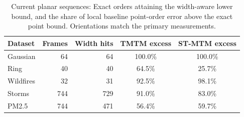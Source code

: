 \begin{table}[!tb]
\centering\caption{Current planar sequences: Exact orders attaining the width-aware lower bound, and the share of local baseline point-order error above the exact point bound. Orientations match the primary measurements.}\label{tab:real-bounds}
\footnotesize\setlength{\tabcolsep}{3pt}
\begin{tabular}{@{}lrrcc@{}}\toprule
Dataset & Frames & Width hits & TMTM excess & ST-MTM excess\\\midrule
Gaussian & 64 & 64 & 100.0\% & 100.0\% \\
Ring & 40 & 40 & 64.5\% & 25.7\% \\
Wildfires & 32 & 31 & 92.5\% & 98.1\% \\
Storms & 744 & 729 & 91.0\% & 83.0\% \\
PM2.5 & 744 & 471 & 56.4\% & 59.7\% \\
\bottomrule\end{tabular}\end{table}